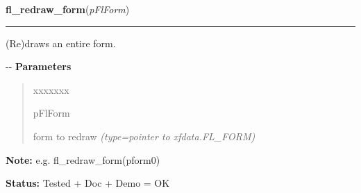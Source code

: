 \hspace{.8\funcindent}\begin{boxedminipage}{\funcwidth}

    \raggedright \textbf{fl\_redraw\_form}(\textit{pFlForm})

    \vspace{-1.5ex}

    \rule{\textwidth}{0.5\fboxrule}
\setlength{\parskip}{2ex}

(Re)draws an entire form.

-{}-
\setlength{\parskip}{1ex}
      \textbf{Parameters}
      \vspace{-1ex}

      \begin{quote}
        \begin{Ventry}{xxxxxxx}

          \item[pFlForm]


form to redraw
            {\it (type=pointer to xfdata.FL\_FORM)}

        \end{Ventry}

      \end{quote}

\textbf{Note:} 
e.g. fl\_redraw\_form(pform0)


\textbf{Status:} 
Tested + Doc + Demo = OK


    \end{boxedminipage}

    \label{xformslib:flbasic:fl_set_form_dblbuffer}

    \vspace{0.5ex}

